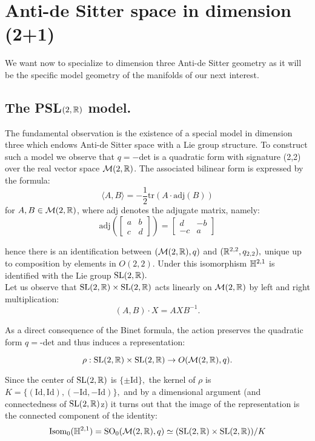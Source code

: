 \chapter{Anti-de Sitter space in dimension (2+1)}
We want now to specialize to dimension three Anti-de Sitter geometry as it will be the specific model geometry of the manifolds of our next interest. 
\section{The {PSL}$(2,\mathbb{R})$ model.} 

The fundamental observation is the existence of a special model in dimension three which endows Anti-de Sitter space with a Lie group structure. To construct such a model we observe that $q=-$det is a quadratic form with signature (2,2) over the real vector space $\mathcal{M}(2,\mathbb{R})$. The associated bilinear form is expressed by the formula:
\begin{equation}\label{quadratic}
    \langle A,B\rangle=-\frac{1}{2}\text{tr}(A\cdot\text{adj}(B))
\end{equation}
for $A,B\in\mathcal{M}(2,\mathbb{R})$, where adj denotes the adjugate matrix, namely: 
\[
    \text{adj}(\begin{bmatrix}
        a & b \\
        c & d
    \end{bmatrix}) = \begin{bmatrix}
        d & -b \\
        -c & a
    \end{bmatrix}
\]

hence there is an identification between $(\mathcal{M}(2,\mathbb{R}),q)$ and $(\mathbb{R}^{2,2}, q_{2,2}),$ unique up to composition by elements in $O(2,2)$. Under this isomorphism $\mathbb{H}^{2,1}$ is identified with the Lie group $\text{SL}(2,\mathbb{R}).$\\
Let us observe that $\text{SL}(2,\mathbb{R})\times \text{SL}(2,\mathbb{R})$ acts linearly on $\mathcal{M}(2,\mathbb{R})$ by left and right multiplication:
$$(A,B)\cdot X=AXB^{-1}.$$

As a direct consequence of the Binet formula, the action preserves the quadratic form $q=$-det and thus induces a representation: 

\[ \rho:\text{SL}(2,\mathbb{R})\times \text{SL}(2,\mathbb{R})\to O(\mathcal{M}(2,\mathbb{R}),q). \]

Since the center of $\text{SL}(2,\mathbb{R})$ is $\{\pm \text{Id}\},$ the kernel of $\rho$ is $K=\{(\text{Id},\text{Id}),(-\text{Id},-\text{Id})\},$ and by a dimensional argument (and connectedness of $\text{SL}(2,\mathbb{R})$z) it turns out that the image of the representation is the connected component of the identity: 
\[
    \text{Isom}_0(\mathbb{H}^{2,1})=\text{SO}_0(\mathcal{M}(2,\mathbb{R}),q)\simeq (\text{SL}(2,\mathbb{R})\times \text{SL}(2,\mathbb{R}))/K
\]
    
